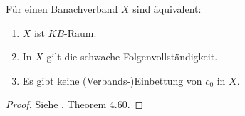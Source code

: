 










\begin{satz}
Für einen Banachverband $X$ sind äquivalent:
\begin{enumerate}
\item $X$ ist $KB$-Raum.
\item In $X$  gilt die schwache Folgenvollständigkeit.
\item Es gibt keine (Verbands-)Einbettung von $c_0$ in $X$.
\end{enumerate}
\end{satz}
\begin{proof}

Siehe \cite{aliprantis_burkinshaw_2006}, Theorem 4.60.
\end{proof}

